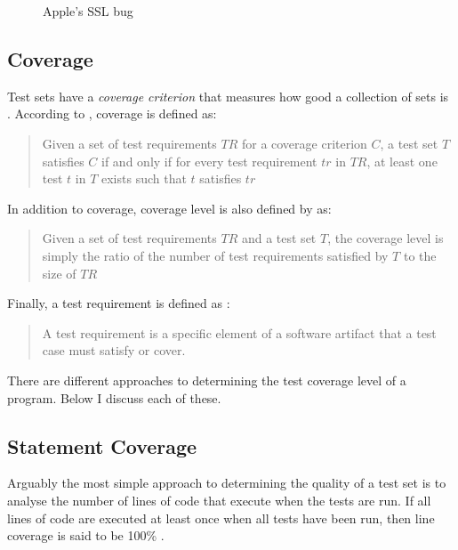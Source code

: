 \begin{figure}
	\centering
	
	\caption{Apple's SSL bug \cite{appleBug}}
	\label{fig:AppleBug}
\end{figure}

\subsection{Coverage}

Test sets have a \emph{coverage criterion} that measures how good a collection of sets is \citep{softwareTestingIntro}. According to \citet{softwareTestingIntro}, coverage is defined as:

\begin{quote} Given a set of test requirements $TR$ for a coverage criterion $C$, a test set $T$ satisfies $C$ if and only if for every test requirement $tr$ in $TR$, at least one test $t$ in $T$ exists such that $t$ satisfies $tr$ \end{quote}

In addition to coverage, coverage level is also defined by \citep{softwareTestingIntro} as:

\begin{quote}Given a set of test requirements $TR$ and a test set $T$, the coverage level is simply the ratio of the number of test requirements satisfied by $T$ to the size of $TR$\end{quote}

Finally, a test requirement is defined as \cite{softwareTestingIntro}:

\begin{quote}A test requirement is a specific element of a software artifact that a test case must satisfy or cover.\end{quote}

There are different approaches to determining the test coverage level of a program. Below I discuss each of these.

\subsection{Statement Coverage}

Arguably the most simple approach to determining the quality of a test set is to analyse the number of lines of code that execute when the tests are run. If all lines of code are executed at least once when all tests have been run, then line coverage is said to be 100\% \citep{softwareTestingIntro}.

